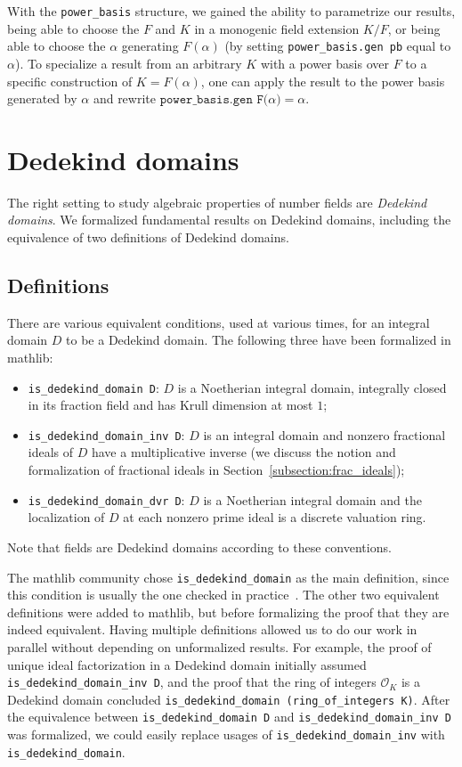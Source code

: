 \documentclass[sn-mathphys]{sn-jnl}%
\newcommand{\lean}[1]{\texttt{#1}\xspace}
\newcommand*{\OK}[1][K]{\mathcal{O}_{#1}}
\newcommand{\mathlib}{\textsf{mathlib}\xspace}
\begin{document}
With the \lean{power\_basis} structure, we gained the ability to parametrize our results,
being able to choose the $F$ and $K$ in a monogenic field extension $K / F$, or being able to choose the $\alpha$ generating $F(\alpha)$ (by setting \lean{power\_basis.gen\ pb} equal to $\alpha$).
To specialize a result from an arbitrary $K$ with a power basis over $F$ to a specific construction of $K = F(\alpha)$,
one can apply the result to the power basis generated by $\alpha$ and rewrite $\lean{power\_basis.gen F($\alpha$)} = \alpha$.


\section{Dedekind domains} \label{sec:Dedekind-domain}
The right setting to study algebraic properties of number fields are \emph{Dedekind domains}.
We formalized fundamental results on Dedekind domains, including the equivalence of two definitions of Dedekind domains.

\subsection{Definitions}\label{subsec:definitions_DD}
There are various equivalent conditions, used at various times, for an integral domain $D$ to be a Dedekind domain.
The following three have been formalized in \mathlib:
\begin{itemize}
\item \lean{is\_dedekind\_domain D}: $D$ is a Noetherian integral domain, integrally closed in its fraction field and has Krull dimension at most $1$;
\item \lean{is\_dedekind\_domain\_inv D}: $D$ is an integral domain and nonzero fractional ideals of $D$ have a multiplicative inverse (we discuss the notion and formalization of fractional ideals in Section~\ref{subsection:frac_ideals});
\item \lean{is\_dedekind\_domain\_dvr D}: $D$ is a Noetherian integral domain and the localization of $D$ at each nonzero prime ideal is a discrete valuation ring.
\end{itemize}
Note that fields are Dedekind domains according to these conventions.

The mathlib community chose \lean{is\_dedekind\_domain} as the main definition,
since this condition is usually the one checked in practice~\cite{Neukirch}.
The other two equivalent definitions were added to \mathlib, but before formalizing the proof that they are indeed equivalent.
Having multiple definitions allowed us to do our work in parallel without depending on unformalized results.
For example,
the proof of unique ideal factorization in a Dedekind domain initially assumed \lean{is\_dedekind\_domain\_inv D},
and the proof that the ring of integers $\OK$ is a Dedekind domain concluded \lean{is\_dedekind\_domain (ring\_of\_integers K)}.
After the equivalence between \lean{is\_dedekind\_domain D} and \lean{is\_dedekind\_domain\_inv D} was formalized,
we could easily replace usages of \lean{is\_dedekind\_domain\_inv} with \lean{is\_dedekind\_domain}.
\end{document}
